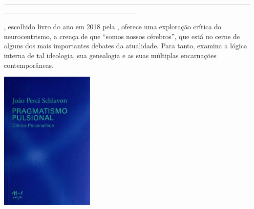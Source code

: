 \hspace*{-2cm}\_\_\_\_\_\_\_\_\_\_\_\_\_\_\_\_\_\_\_\_\_\_\_\_\_\_\_\_\_\_\_\_\_\_\_\_\_\_\_\_\_\_\_\_\_\_\_\_\_\_\_\_\_\_\_\_\_\_\_\_\_\_\_\_\_\_\_\_\_\_\_\_\_\_

\medskip

, escolhido livro do ano em 2018 pela {}, oferece uma exploração crítica do neurocentrismo, a crença de que “somos nossos cérebros”, que está no cerne de alguns dos mais importantes debates da atualidade. Para tanto, examina a lógica interna de tal ideologia, sua genealogia e as suas múltiplas encarnações contemporâneas.

\vfill

\hspace*{-.4cm}\begin{minipage}[c]{1\linewidth}
\small{
{}}
\end{minipage}

\pagebreak

\hspace{.5cm}

\begin{center}
\hspace*{-.5cm}\includegraphics[width=46.5mm]{./imgs/gozo.png}
\end{center}

